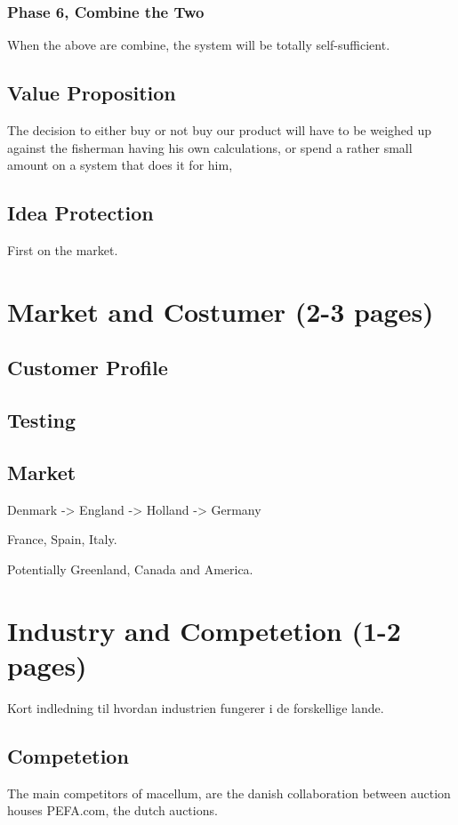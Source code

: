 \documentclass[a4paper,10pt,dateno,oneside,fleqn,sigleft]{newlfm} %
\begin{document}
\begin{newlfm}
\subsubsection{Phase 6, Combine the Two}
When the above are combine, the system will be totally self-sufficient. 

\subsection{Value Proposition}
The decision to either buy or not buy our product will have to be weighed up against the fisherman having his own calculations, or spend a rather small amount on a system that does it for him,

\subsection{Idea Protection}
First on the market. 

\section{Market and Costumer (2-3 pages)}
\subsection{Customer Profile}
\subsection{Testing}
\subsection{Market}
Denmark -> England -> Holland -> Germany

France, Spain, Italy.

Potentially Greenland, Canada and America.

\section{Industry and Competetion (1-2 pages)}
Kort indledning til hvordan industrien fungerer i de forskellige lande. 

\subsection{Competetion}
The main competitors of macellum, are the danish collaboration between auction houses PEFA.com, the dutch auctions. 


\end{newlfm}
\end{document}
